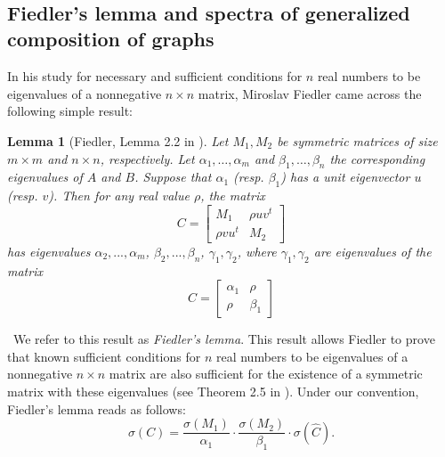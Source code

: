 \documentclass[11pt]{article}
\newtheorem{lemma}[theorem]{Lemma}
\theoremstyle{definition}
\begin{document}
\

\subsection{Fiedler's lemma and spectra of generalized composition of graphs}
In his study for necessary and sufficient conditions for $n$ real numbers to be eigenvalues of a nonnegative $n \times n$ matrix, Miroslav Fiedler came across the following simple result:

\begin{lemma}[Fiedler, Lemma 2.2 in \cite{Fidler1974}]
Let $M_1, M_2$ be symmetric matrices of size $m \times m$ and $n \times n$, respectively. Let $\alpha_1, \hdots, \alpha_m$ and $\beta_1, \hdots, \beta_n$ the corresponding eigenvalues of $A$ and $B$. Suppose that $\alpha_1$ (resp. $\beta_1$) has a unit eigenvector $u$ (resp. $v$). Then for any real value $\rho$, the matrix
\begin{equation}\label{Fiedler}
C=
\begin{bmatrix}
 M_1 & \rho uv^t  \\
 \rho vu^t & M_2
\end{bmatrix}
\end{equation}
has eigenvalues $\alpha_2,..., \alpha_m$, $\beta_2,...,\beta_n$, $\gamma_1, \gamma_2$, where $\gamma_1, \gamma_2$ are eigenvalues of the matrix
\[\widehat{C}=
\begin{bmatrix}
\alpha_1 & \rho   \\
\rho  & \beta_1
\end{bmatrix}\]
\end{lemma}


\
We refer to this result as \emph{Fiedler's lemma}. This result allows Fiedler to prove that known sufficient conditions for $n$ real numbers to be eigenvalues of a nonnegative $n \times n$ matrix are also sufficient for the existence of a symmetric matrix with these eigenvalues (see Theorem 2.5 in \cite{Fidler1974}). Under our convention, Fiedler's lemma reads as follows:
\begin{equation}
\sigma(C) = \frac{\sigma(M_1)}{\alpha_1}\cdot\frac{\sigma(M_2)}{\beta_1}\cdot \sigma(\widehat{C}).
\end{equation}

\medbreak
\end{document}

